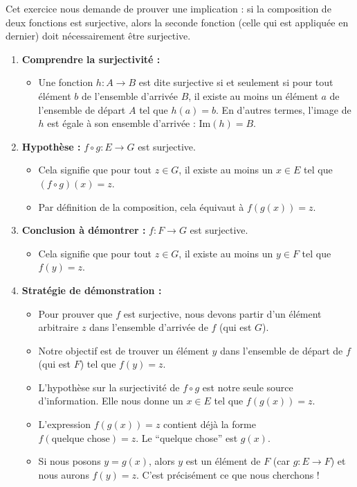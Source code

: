 \documentclass[12pt,a4paper]{report}
\providecommand{\tightlist}{%
  \setlength{\itemsep}{0pt}\setlength{\parskip}{0pt}}
\begin{document}
Cet exercice nous demande de prouver une implication : si la composition
de deux fonctions est surjective, alors la seconde fonction (celle qui
est appliquée en dernier) doit nécessairement être surjective.

\begin{enumerate}
\def\labelenumi{\arabic{enumi}.}
\tightlist
\item
  \textbf{Comprendre la surjectivité :}

  \begin{itemize}
  \tightlist
  \item
    Une fonction \(h: A \to B\) est dite surjective si et seulement si
    pour tout élément \(b\) de l'ensemble d'arrivée \(B\), il existe au
    moins un élément \(a\) de l'ensemble de départ \(A\) tel que
    \(h(a) = b\). En d'autres termes, l'image de \(h\) est égale à son
    ensemble d'arrivée : \(\text{Im}(h) = B\).
  \end{itemize}
\item
  \textbf{Hypothèse :} \(f \circ g: E \to G\) est surjective.

  \begin{itemize}
  \tightlist
  \item
    Cela signifie que pour tout \(z \in G\), il existe au moins un
    \(x \in E\) tel que \((f \circ g)(x) = z\).
  \item
    Par définition de la composition, cela équivaut à \(f(g(x)) = z\).
  \end{itemize}
\item
  \textbf{Conclusion à démontrer :} \(f: F \to G\) est surjective.

  \begin{itemize}
  \tightlist
  \item
    Cela signifie que pour tout \(z \in G\), il existe au moins un
    \(y \in F\) tel que \(f(y) = z\).
  \end{itemize}
\item
  \textbf{Stratégie de démonstration :}

  \begin{itemize}
  \tightlist
  \item
    Pour prouver que \(f\) est surjective, nous devons partir d'un
    élément arbitraire \(z\) dans l'ensemble d'arrivée de \(f\) (qui est
    \(G\)).
  \item
    Notre objectif est de trouver un élément \(y\) dans l'ensemble de
    départ de \(f\) (qui est \(F\)) tel que \(f(y) = z\).
  \item
    L'hypothèse sur la surjectivité de \(f \circ g\) est notre seule
    source d'information. Elle nous donne un \(x \in E\) tel que
    \(f(g(x)) = z\).
  \item
    L'expression \(f(g(x)) = z\) contient déjà la forme
    \(f(\text{quelque chose}) = z\). Le ``quelque chose'' est \(g(x)\).
  \item
    Si nous posons \(y = g(x)\), alors \(y\) est un élément de \(F\)
    (car \(g: E \to F\)) et nous aurons \(f(y) = z\). C'est précisément
    ce que nous cherchons !
  \end{itemize}
\end{enumerate}
\end{document}
